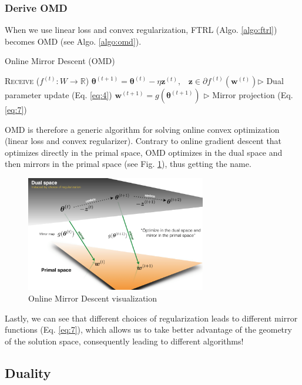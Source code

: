 \documentclass[11pt]{article}
\begin{document}
\subsubsection{Derive OMD}
When we use linear loss and convex regularization, FTRL (Algo. \ref{algo:ftrl}) becomes OMD (see Algo. \ref{algo:omd}). 

\begin{algorithm}[H]
\caption{Online Mirror Descent (OMD)}
\label{algo:omd}
\begin{algorithmic}[1]
\STATE \textsc{Receive} ($f^{(t)}: W \rightarrow \mathbb{R}$)
\STATE $\bm\theta^{(t+1)} = \bm\theta^{(t)} - \eta \textbf{z}^{(t)}, \;\;\; \textbf{z} \in \partial f^{(t)}(\textbf{w}^{(t)}) $\hfill $\triangleright$ Dual parameter update (Eq. \ref{eq:4})
\STATE $\textbf{w}^{(t+1)} = g(\bm\theta^{(t+1)})$ \hfill $\triangleright$ Mirror projection (Eq. \ref{eq:7})
\ENDFOR
\end{algorithmic}
\end{algorithm}

OMD is therefore a generic algorithm for solving online convex optimization (linear loss and convex regularizer). Contrary to online gradient descent that optimizes directly in the primal space, OMD optimizes in the dual space and then mirrors in the primal space (see Fig. \ref{fig:omd}), thus getting the name.

\begin{figure}[H]
    \centering
    \includegraphics[width=0.7\textwidth]{figs/OMD.png}
    \caption{Online Mirror Descent visualization}
    \label{fig:omd}
\end{figure}

Lastly, we can see that different choices of regularization leads to different mirror functions (Eq. \ref{eq:7}), which allows us to take better advantage of the geometry of the solution space, consequently leading to different algorithms!

\subsection{Duality}
\label{sec:duality}
\end{document}
